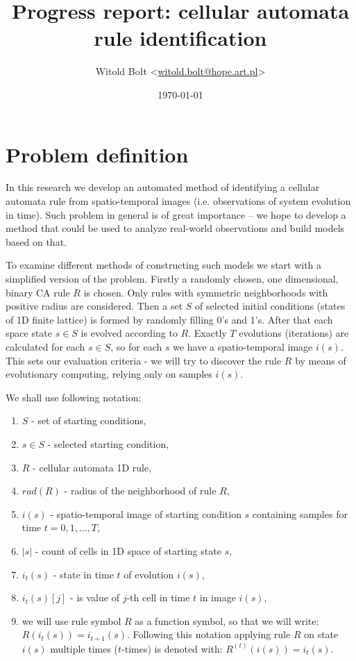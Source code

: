 \documentclass[12pt,a4paper]{article}
\title{Progress report: cellular automata rule identification}
\author{Witold Bołt <\href{mailto:witold.bolt@hope.art.pl}{witold.bolt@hope.art.pl}>}
\date{\today}
\begin{document}
\maketitle

\section{Problem definition}

In this research we develop an automated method of identifying a cellular automata rule from spatio-temporal images (i.e. observations of system evolution in time). Such problem in general is of great importance -- we hope to develop a method that could be used to analyze real-world observations and build models based on that.

To examine different methods of constructing such models we start with a simplified version of the problem. Firstly a randomly chosen, one dimensional, binary CA rule $R$ is chosen. Only rules with symmetric neighborhoods with positive radius are considered.
Then a set $S$ of selected initial conditions (states of 1D finite lattice) is formed by randomly filling 0's and 1's. After that each space state $s\in S$ is evolved according to $R$. Exactly $T$ evolutions (iterations) are calculated for each $s\in S$, so for each $s$ we have a spatio-temporal image $i(s)$. This sets our evaluation criteria - we will try to discover the rule $R$ by means of evolutionary computing, relying only on samples $i(s)$.   

We shall use following notation:
\begin{enumerate}
\item $S$ - set of starting conditions,
\item $s\in S$ - selected starting condition,
\item $R$ - cellular automata 1D rule,
\item $rad(R)$ - radius of the neighborhood of rule $R$, 
\item $i(s)$ - spatio-temporal image of starting condition $s$ containing samples for time $t=0,1,\ldots,T$,
\item $|s|$ - count of cells in 1D space of starting state $s$,
\item $i_t(s)$ - state in time $t$ of evolution $i(s)$,
\item $i_{t}(s)[j]$ - is value of $j$-th cell in time $t$ in image $i(s)$,
\item we will use rule symbol $R$ as a function symbol, so that we will write: $R(i_t(s)) = i_{t+1}(s)$. Following this notation applying rule $R$ on state $i(s)$ multiple times ($t$-times) is denoted with: $R^{(t)}(i(s)) = i_t(s)$.
\end{enumerate}
\end{document}
